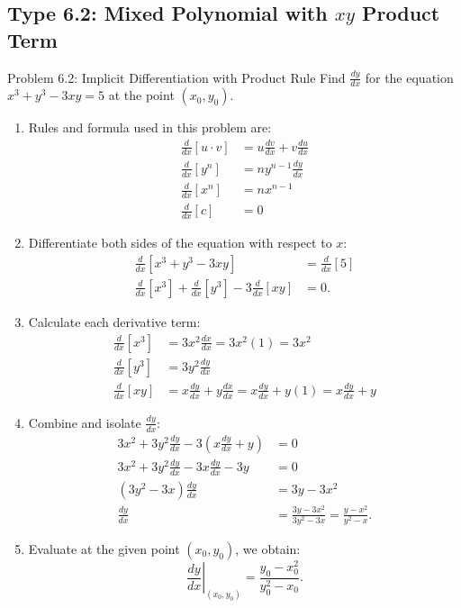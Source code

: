 \documentclass[11pt,a4paper]{article}
\begin{document}
\subsection{Type 6.2: Mixed Polynomial with $xy$ Product Term}
\begin{problembox}{Problem 6.2: Implicit Differentiation with Product Rule}
Find $\frac{dy}{dx}$ for the equation $x^3 + y^3 - 3xy = 5$ at the point $(x_0, y_0)$.
\end{problembox}
\begin{solutionbox}
\begin{enumerate}
	\item [Step 1.] Rules and formula used in this problem are:
	\begin{align*}
		\frac{d}{dx}[u \cdot v] &= u \frac{dv}{dx} + v \frac{du}{dx} \\
		\frac{d}{dx}[y^n] &= n y^{n-1} \frac{dy}{dx} \\
		\frac{d}{dx}[x^n] &= n x^{n-1} \\
		\frac{d}{dx}[c] &= 0
	\end{align*}
	
	\item [Step 2.] Differentiate both sides of the equation with respect to $x$:
	\begin{align*}\label{eq;6.2.1}
		\frac{d}{dx}\left[x^3 + y^3 - 3xy\right] &= \frac{d}{dx}[5] \\
		\frac{d}{dx}[x^3] + \frac{d}{dx}[y^3] - 3\frac{d}{dx}[xy] &= 0.
	\end{align*}

	\item [Step 3.] Calculate each derivative term:
	\begin{align*}
		\frac{d}{dx}[x^3] &= 3x^2\frac{dx}{dx} = 3x^2(1) = 3x^2 \\
		\frac{d}{dx}[y^3] &= 3y^2\frac{dy}{dx} \\
		\frac{d}{dx}[xy] &= x\frac{dy}{dx} + y\frac{dx}{dx} = x\frac{dy}{dx} + y(1) = x\frac{dy}{dx} + y
	\end{align*}

	\item [Step 4.] Combine and isolate $\frac{dy}{dx}$:
	\begin{align*}
		3x^2 + 3y^2\frac{dy}{dx} - 3\left(x\frac{dy}{dx} + y\right) &= 0 \\
		3x^2 + 3y^2\frac{dy}{dx} - 3x\frac{dy}{dx} - 3y &= 0 \\
		(3y^2 - 3x)\frac{dy}{dx} &= 3y - 3x^2 \\
		\frac{dy}{dx} &= \frac{3y - 3x^2}{3y^2 - 3x} = \frac{y - x^2}{y^2 - x}.
	\end{align*}

	\item [Step 5.] Evaluate at the given point $(x_0, y_0)$, we obtain:
	\begin{equation*}
		\left.\frac{dy}{dx}\right|_{(x_0, y_0)} = \frac{y_0 - x_0^2}{y_0^2 - x_0}.
	\end{equation*}
\end{enumerate}
\end{solutionbox}
\end{document}
